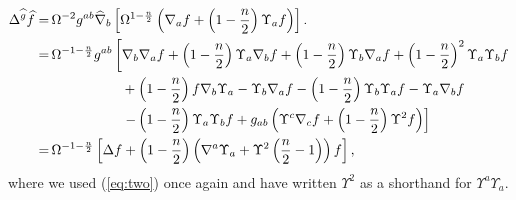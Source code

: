 \documentclass[a4paper,12pt]{amsart}
\theoremstyle{remark}
\newcommand{\nn}[1]{(\ref{#1})}
\begin{document}
\begin{equation}\nonumber
\begin{split}
\Delta^{\widehat{g}}\widehat{f}
=&\,\Omega^{-2} g^{ab} \widehat{\nabla}_b\left[\Omega^{1-\frac{n}{2}}
\left(\nabla_a f+\left(1-\frac{n}{2}\right)\Upsilon_a f \right)\right].\\
 =&\,\Omega^{-1-\frac{n}{2}}g^{ab}\left[\nabla_b\nabla_a f +
 \left(1-\frac{n}{2}\right)\Upsilon_a\nabla_b f +
 \left(1-\frac{n}{2}\right)\Upsilon_b\nabla_a f+
 \left(1-\frac{n}{2}\right)^2\Upsilon_a\Upsilon_b f\right.\\
 &\,\hspace{18mm}+\left(1-\frac{n}{2}\right)f\nabla_b\Upsilon_a -
 \Upsilon_b\nabla_a f -\left(1-\frac{n}{2}\right)\Upsilon_b\Upsilon_a f
 -\Upsilon_a\nabla_b f \\
 &\,\left.\hspace{18mm}-\left(1-\frac{n}{2}\right)\Upsilon_a\Upsilon_b f
 +g_{ab}\left(\Upsilon^c\nabla_c f+\left(1-\frac{n}{2}\right)\Upsilon^2f\right)
 \right]\\
=&\,\Omega^{-1-\frac{n}{2}}\left[\Delta f+ \left(1-\frac{n}{2}\right)
\left(\nabla^a\Upsilon_a+\Upsilon^2\left(\frac{n}{2}-1\right)\right)f \right],
\end{split}
\end{equation}
where we used \nn{eq:two} once again and have written $\Upsilon^2$ as a shorthand for $\Upsilon^a\Upsilon_a$.
\end{document}
